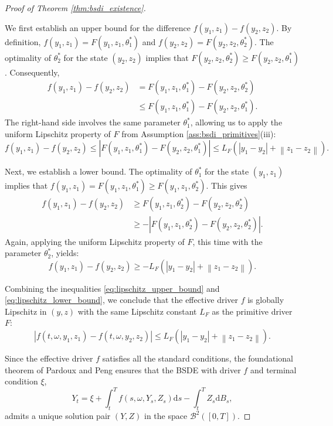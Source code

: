 \documentclass[12pt, letterpaper]{amsart}
\newcommand{\Bcal}{\mathcal{B}}
\newcommand{\dd}{\mathrm{d}}
\newcommand{\norm}[1]{\left\lVert#1\right\rVert}
\theoremstyle{plain}
\theoremstyle{definition}
\theoremstyle{remark}
\numberwithin{equation}{section} %
\begin{document}
\begin{proof}[Proof of Theorem \ref{thm:bsdi_existence}]
\begin{enumerate}[label=(\alph*)]
    We first establish an upper bound for the difference $f(y_1,z_1) - f(y_2,z_2)$. By definition, $f(y_1,z_1) = F(y_1,z_1,\theta_1^*)$ and $f(y_2,z_2) = F(y_2,z_2,\theta_2^*)$. The optimality of $\theta_2^*$ for the state $(y_2,z_2)$ implies that $F(y_2,z_2,\theta_2^*) \ge F(y_2,z_2,\theta_1^*)$. Consequently,
    \begin{align*}
        f(y_1,z_1) - f(y_2,z_2) &= F(y_1,z_1,\theta_1^*) - F(y_2,z_2,\theta_2^*) \\
        &\le F(y_1,z_1,\theta_1^*) - F(y_2,z_2,\theta_1^*).
    \end{align*}
    The right-hand side involves the same parameter $\theta_1^*$, allowing us to apply the uniform Lipschitz property of $F$ from Assumption \ref{ass:bsdi_primitives}(iii):
    \begin{equation} \label{eq:lipschitz_upper_bound}
        f(y_1,z_1) - f(y_2,z_2) \le |F(y_1,z_1,\theta_1^*) - F(y_2,z_2,\theta_1^*)| \le L_F(|y_1-y_2| + \norm{z_1-z_2}).
    \end{equation}

    Next, we establish a lower bound. The optimality of $\theta_1^*$ for the state $(y_1,z_1)$ implies that $f(y_1,z_1) = F(y_1,z_1,\theta_1^*) \ge F(y_1,z_1,\theta_2^*)$. This gives
    \begin{align*}
        f(y_1,z_1) - f(y_2,z_2) &\ge F(y_1,z_1,\theta_2^*) - F(y_2,z_2,\theta_2^*) \\
        &\ge -|F(y_1,z_1,\theta_2^*) - F(y_2,z_2,\theta_2^*)|.
    \end{align*}
    Again, applying the uniform Lipschitz property of $F$, this time with the parameter $\theta_2^*$, yields:
    \begin{equation} \label{eq:lipschitz_lower_bound}
         f(y_1,z_1) - f(y_2,z_2) \ge -L_F(|y_1-y_2| + \norm{z_1-z_2}).
    \end{equation}

    Combining the inequalities \eqref{eq:lipschitz_upper_bound} and \eqref{eq:lipschitz_lower_bound}, we conclude that the effective driver $f$ is globally Lipschitz in $(y,z)$ with the same Lipschitz constant $L_F$ as the primitive driver $F$:
    \[ |f(t,\omega,y_1,z_1) - f(t,\omega,y_2,z_2)| \le L_F(|y_1-y_2| + \norm{z_1-z_2}). \]
\end{enumerate}
Since the effective driver $f$ satisfies all the standard conditions, the foundational theorem of Pardoux and Peng \cite{PardouxPeng1990} ensures that the BSDE with driver $f$ and terminal condition $\xi$,
\[ Y_t = \xi + \int_t^T f(s, \omega, Y_s, Z_s) \dd s - \int_t^T Z_s \dd B_s, \]
admits a unique solution pair $(Y,Z)$ in the space $\Bcal^2([0,T])$.


\end{proof}
\end{document}
